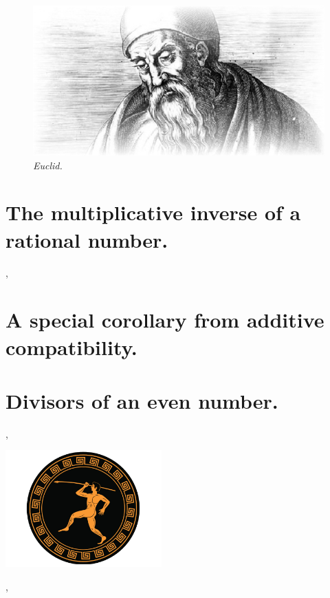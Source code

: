 \documentclass[preview]{standalone}
\begin{document}
\begin{figure}[h!]
    \centering
    \includegraphics[width=11.5cm]{../resources/jpg/1.6.introduction.to.proofs/euclid.jpg}
    \caption*{\emph{Euclid.}}
\end{figure}
\section{The multiplicative inverse of a rational number.}

\sep
\vspace{0.3\baselineskip}

\section{A special corollary from additive compatibility.}

\pagebreak


\section{Divisors of an even number.}

\sep
\vspace{0.2\baselineskip}
\begin{center}
    \includegraphics[width=6cm]{../resources/jpg/1.6.introduction.to.proofs/olympics.jpg}
\end{center}
\sep
\end{document}
